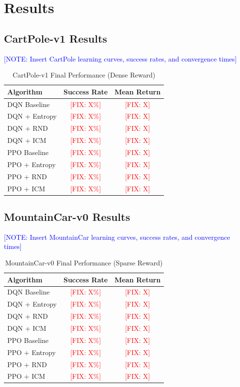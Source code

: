 \documentclass[conference]{IEEEtran}
\newcommand{\fix}[1]{\textcolor{red}{[FIX: #1]}}
\newcommand{\note}[1]{\textcolor{blue}{[NOTE: #1]}}
\begin{document}
\section{Results}

\subsection{CartPole-v1 Results}
\note{Insert CartPole learning curves, success rates, and convergence times}

\begin{table}[H]
  \centering
  \caption{CartPole-v1 Final Performance (Dense Reward)}
  \begin{tabular}{lcc}
    \toprule
    \textbf{Algorithm} & \textbf{Success Rate} & \textbf{Mean Return} \\
    \midrule
    DQN Baseline & \fix{X\%} & \fix{X} \\
    DQN + Entropy & \fix{X\%} & \fix{X} \\
    DQN + RND & \fix{X\%} & \fix{X} \\
    DQN + ICM & \fix{X\%} & \fix{X} \\
    PPO Baseline & \fix{X\%} & \fix{X} \\
    PPO + Entropy & \fix{X\%} & \fix{X} \\
    PPO + RND & \fix{X\%} & \fix{X} \\
    PPO + ICM & \fix{X\%} & \fix{X} \\
    \bottomrule
  \end{tabular}
\end{table}

\subsection{MountainCar-v0 Results}
\note{Insert MountainCar learning curves, success rates, and convergence times}

\begin{table}[H]
  \centering
  \caption{MountainCar-v0 Final Performance (Sparse Reward)}
  \begin{tabular}{lcc}
    \toprule
    \textbf{Algorithm} & \textbf{Success Rate} & \textbf{Mean Return} \\
    \midrule
    DQN Baseline & \fix{X\%} & \fix{X} \\
    DQN + Entropy & \fix{X\%} & \fix{X} \\
    DQN + RND & \fix{X\%} & \fix{X} \\
    DQN + ICM & \fix{X\%} & \fix{X} \\
    PPO Baseline & \fix{X\%} & \fix{X} \\
    PPO + Entropy & \fix{X\%} & \fix{X} \\
    PPO + RND & \fix{X\%} & \fix{X} \\
    PPO + ICM & \fix{X\%} & \fix{X} \\
    \bottomrule
  \end{tabular}
\end{table}
\end{document}
